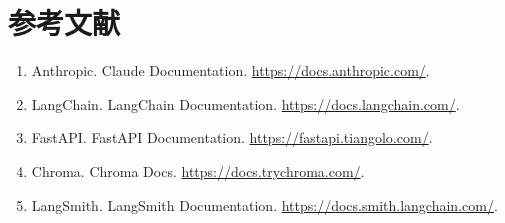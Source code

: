 \documentclass[UTF8,zihao=-4,a4paper]{ctexart}
\begin{document}
\clearpage

\section{参考文献}

\begin{enumerate}
  \item Anthropic. Claude Documentation. \url{https://docs.anthropic.com/}.
  \item LangChain. LangChain Documentation. \url{https://docs.langchain.com/}.
  \item FastAPI. FastAPI Documentation. \url{https://fastapi.tiangolo.com/}.
  \item Chroma. Chroma Docs. \url{https://docs.trychroma.com/}.
  \item LangSmith. LangSmith Documentation. \url{https://docs.smith.langchain.com/}.
\end{enumerate}
\end{document}
